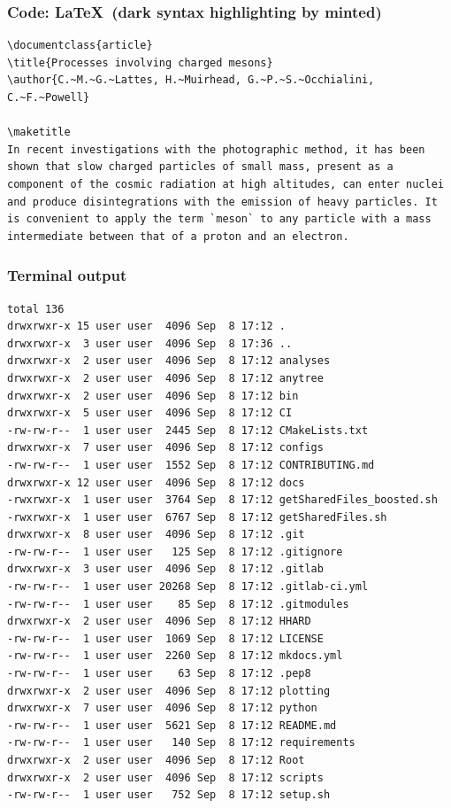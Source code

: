 \begin{frame}[fragile]
\frametitle{Code: \LaTeX~(dark syntax highlighting by minted)}
{
\color{white255255255}
\begin{verbatim}
\documentclass{article}
\title{Processes involving charged mesons}
\author{C.~M.~G.~Lattes, H.~Muirhead, G.~P.~S.~Occhialini, C.~F.~Powell}

\maketitle
In recent investigations with the photographic method, it has been shown that slow charged particles of small mass, present as a component of the cosmic radiation at high altitudes, can enter nuclei and produce disintegrations with the emission of heavy particles. It is convenient to apply the term `meson` to any particle with a mass intermediate between that of a proton and an electron.

\end{verbatim}
}
\end{frame}

\begin{frame}[fragile]
\frametitle{Terminal output}
\begin{verbatim}
total 136
drwxrwxr-x 15 user user  4096 Sep  8 17:12 .
drwxrwxr-x  3 user user  4096 Sep  8 17:36 ..
drwxrwxr-x  2 user user  4096 Sep  8 17:12 analyses
drwxrwxr-x  2 user user  4096 Sep  8 17:12 anytree
drwxrwxr-x  2 user user  4096 Sep  8 17:12 bin
drwxrwxr-x  5 user user  4096 Sep  8 17:12 CI
-rw-rw-r--  1 user user  2445 Sep  8 17:12 CMakeLists.txt
drwxrwxr-x  7 user user  4096 Sep  8 17:12 configs
-rw-rw-r--  1 user user  1552 Sep  8 17:12 CONTRIBUTING.md
drwxrwxr-x 12 user user  4096 Sep  8 17:12 docs
-rwxrwxr-x  1 user user  3764 Sep  8 17:12 getSharedFiles_boosted.sh
-rwxrwxr-x  1 user user  6767 Sep  8 17:12 getSharedFiles.sh
drwxrwxr-x  8 user user  4096 Sep  8 17:12 .git
-rw-rw-r--  1 user user   125 Sep  8 17:12 .gitignore
drwxrwxr-x  3 user user  4096 Sep  8 17:12 .gitlab
-rw-rw-r--  1 user user 20268 Sep  8 17:12 .gitlab-ci.yml
-rw-rw-r--  1 user user    85 Sep  8 17:12 .gitmodules
drwxrwxr-x  2 user user  4096 Sep  8 17:12 HHARD
-rw-rw-r--  1 user user  1069 Sep  8 17:12 LICENSE
-rw-rw-r--  1 user user  2260 Sep  8 17:12 mkdocs.yml
-rw-rw-r--  1 user user    63 Sep  8 17:12 .pep8
drwxrwxr-x  2 user user  4096 Sep  8 17:12 plotting
drwxrwxr-x  7 user user  4096 Sep  8 17:12 python
-rw-rw-r--  1 user user  5621 Sep  8 17:12 README.md
-rw-rw-r--  1 user user   140 Sep  8 17:12 requirements
drwxrwxr-x  2 user user  4096 Sep  8 17:12 Root
drwxrwxr-x  2 user user  4096 Sep  8 17:12 scripts
-rw-rw-r--  1 user user   752 Sep  8 17:12 setup.sh
\end{verbatim}
\end{frame}

